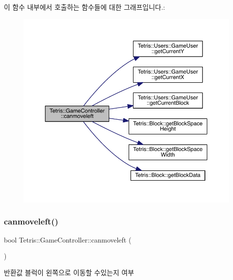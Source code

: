 이 함수 내부에서 호출하는 함수들에 대한 그래프입니다.\+:
\nopagebreak
\begin{figure}[H]
\begin{center}
\leavevmode
\includegraphics[width=350pt]{db/dd2/class_tetris_1_1_game_controller_ae541cf926ccdce47a185c94a0c80b642_cgraph}
\end{center}
\end{figure}
\mbox{\label{class_tetris_1_1_game_controller_ae541cf926ccdce47a185c94a0c80b642}} 
\subsubsection{\texorpdfstring{canmoveleft()}{canmoveleft()}\hspace{0.1cm}{\footnotesize\ttfamily [2/2]}}
{\footnotesize\ttfamily bool Tetris\+::\+Game\+Controller\+::canmoveleft (\begin{DoxyParamCaption}{ }\end{DoxyParamCaption})\hspace{0.3cm}{\ttfamily [inline]}}

\begin{DoxyReturn}{반환값}
블럭이 왼쪽으로 이동할 수있는지 여부 
\end{DoxyReturn}


